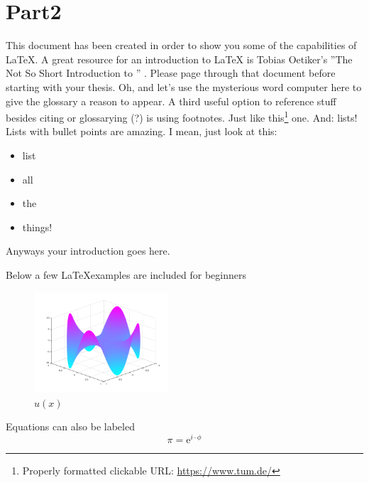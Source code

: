 \chapter{Part2}
\label{chapter:Part2}
This document has been created in order to show you some of the capabilities 
of \LaTeX.  A great resource for an introduction to \LaTeX\xspace is Tobias
Oetiker's ''The Not So Short Introduction to \LaTeXe'' \cite{latex}.  Please
page through that document
before starting with your thesis.
Oh, and let's use the mysterious word \gls{computer} here to give the glossary
a reason to appear.
A third useful option to reference stuff besides citing or glossarying (?) 
is using footnotes. Just like
this\footnote{Properly formatted clickable URL: \url{https://www.tum.de/}}
one.
And: lists! Lists with bullet points are amazing. I mean, just look at this:
\begin{itemize}
	\item list
	\item all 
	\item the 
	\item things!
\end{itemize}
\par
Anyways your introduction goes here.


Below a few \LaTeX examples are included for beginners
\begin{figure}[ht]
  \centering
  \includegraphics[width=5cm]{images/swing_function_plot.png}
  \caption{$u(x)$}%
  \label{fig:swingPlot}
\end{figure}


Equations can also be labeled
\begin{equation}
	\pi = \mathrm{e}^{i\cdot\phi}
	\label{eq:equation1}
\end{equation}


